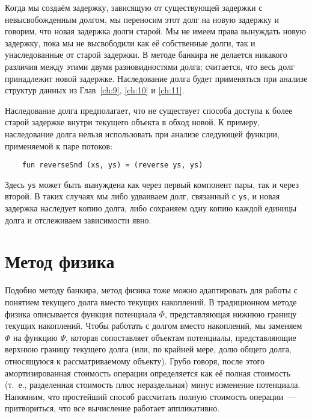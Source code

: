 Когда мы создаём задержку, зависящую от существующей задержки с
невысвобожденным долгом, мы переносим этот долг на новую задержку и
говорим, что новая задержка  долги
старой. Мы не имеем права вынуждать новую задержку, пока мы не
высвободили как её собственные долги, так и унаследованные от старой
задержки. В методе банкира не делается никакого различия между этими
двумя разновидностями долга; считается, что весь долг принадлежит
новой задержке. Наследование долга будет применяться при анализе
структур данных из Глав~\ref{ch:9}, \ref{ch:10} и \ref{ch:11}.

\begin{remark}
  Наследование долга предполагает, что не существует способа доступа к
  более старой задержке внутри текущего объекта в обход новой. К
  примеру, наследование долга нельзя использовать при анализе следующей
  функции, применяемой к паре потоков:
  \begin{lstlisting}
    fun reverseSnd (xs, ys) = (reverse ys, ys)
  \end{lstlisting}
  Здесь \lstinline!ys! может быть вынуждена как через первый компонент
  пары, так и через второй. В таких случаях мы либо удваиваем долг,
  связанный с \lstinline!ys!, и новая задержка наследует копию долга,
  либо сохраняем одну копию каждой единицы долга и отслеживаем
  зависимости явно.
\end{remark}

\section{Метод физика}
\label{sc:6.4}

Подобно методу банкира, метод физика тоже можно адаптировать для работы
с понятием текущего долга вместо текущих накоплений.  В традиционном
методе физика описывается функция потенциала $\Phi$, представляющая
нижнюю границу текущих накоплений. Чтобы работать с долгом вместо
накоплений, мы заменяем $\Phi$ на функцию $\Psi$, которая сопоставляет
объектам потенциалы, представляющие верхнюю границу текущего долга
(или, по крайней мере, долю общего долга, относящуюся к
рассматриваемому объекту).  Грубо говоря, после этого амортизированная
стоимость операции определяется как её полная стоимость (т.~е.,
разделенная стоимость плюс нераздельная) минус изменение
потенциала. Напомним, что простейший способ рассчитать полную
стоимость операции~--- притвориться, что все вычисление работает
аппликативно. 

